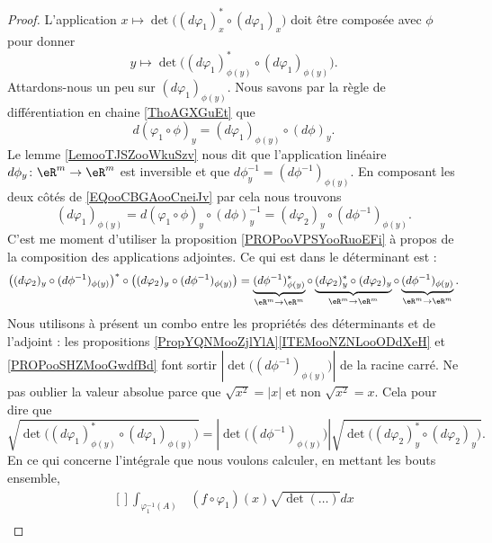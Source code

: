 \begin{proof}
	L'application \( x\mapsto \det\big( (d\varphi_1)_x^*\circ(d\varphi_1)_x \big)\) doit être composée avec \( \phi\) pour donner
	\begin{equation}
		y\mapsto\det\big( (d\varphi_1)_{\phi(y)}^*\circ(d\varphi_1)_{\phi(y)} \big).
	\end{equation}
	Attardons-nous un peu sur \( (d\varphi_1)_{\phi(y)}\). Nous savons par la règle de différentiation en chaine \ref{ThoAGXGuEt} que
	\begin{equation}        \label{EQooCBGAooCneiJv}
		d(\varphi_1\circ \phi)_y=(d\varphi_1)_{\phi(y)}\circ(d\phi)_y.
	\end{equation}
	Le lemme \ref{LemooTJSZooWkuSzv} nous dit que l'application linéaire \( d\phi_y\colon \eR^m\to \eR^m\) est inversible et que \( d\phi_y^{-1}=(d\phi^{-1})_{\phi(y)}\). En composant les deux côtés de \eqref{EQooCBGAooCneiJv} par cela nous trouvons
	\begin{equation}
		(d\varphi_1)_{\phi(y)}=d(\varphi_1\circ\phi)_y\circ(d\phi)_y^{-1}=(d\varphi_2)_y\circ(d\phi^{-1})_{\phi(y)}.
	\end{equation}
	C'est me moment d'utiliser la proposition \ref{PROPooVPSYooRuoEFi} à propos de la composition des applications adjointes. Ce qui est dans le déterminant est :
	\begin{equation}
		\big( (d\varphi_2)_y\circ(d\phi^{-1})_{\phi(y)} \big)^*\circ\big( (d\varphi_2)_y\circ(d\phi^{-1})_{\phi(y)} \big)=
		\underbrace{(d\phi^{-1})_{\phi(y)}^*}_{\eR^m\to \eR^m}\circ\underbrace{(d\varphi_2)^*_y\circ(d\varphi_2)_y}_{\eR^m\to \eR^m}\circ\underbrace{(d\phi^{-1})_{\phi(y)}}_{\eR^m\to \eR^m}.
	\end{equation}
	Nous utilisons à présent un combo entre les propriétés des déterminants et de l'adjoint : les propositions \ref{PropYQNMooZjlYlA}\ref{ITEMooNZNLooODdXeH} et \ref{PROPooSHZMooGwdfBd} font sortir \( | \det\big( (d\phi^{-1})_{\phi(y)} \big) |\) de la racine carré. Ne pas oublier la valeur absolue parce que \( \sqrt{ x^2 }=| x |\) et non \( \sqrt{ x^2 }=x\). Cela pour dire que
	\begin{equation}
		\sqrt{ \det\big( (d\varphi_1)_{\phi(y)}^*\circ(d\varphi_1)_{\phi(y)} \big) }=| \det\big( (d\phi^{-1})_{\phi(y)} \big) |\sqrt{ \det\big( (d\varphi_2)_y^*\circ(d\varphi_2)_y \big) }.
	\end{equation}
	En ce qui concerne l'intégrale que nous voulons calculer, en mettant les bouts ensemble,
	\begin{equation}
		\begin{aligned}[]
			\int_{\varphi_1^{-1}(A)} & (f\circ\varphi_1)(x)\sqrt{ \det(\ldots) }dx                                                                                                                             \\

\end{aligned}
\end{equation}
\end{proof}

